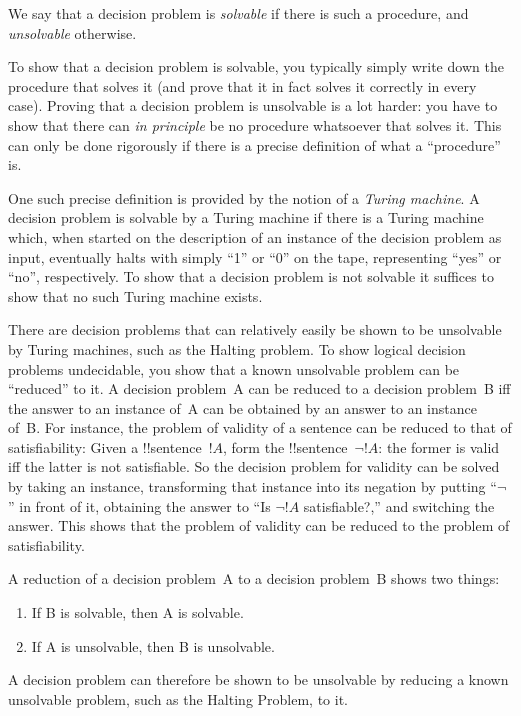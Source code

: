 \documentclass[../../include/open-logic-section]{subfiles}
\begin{document}
\begin{explain}
We say that a decision problem is \emph{solvable} if there is such a
procedure, and \emph{unsolvable} otherwise.

To show that a decision problem is solvable, you typically simply
write down the procedure that solves it (and prove that it in fact
solves it correctly in every case).  Proving that a decision problem
is unsolvable is a lot harder: you have to show that there can
\emph{in principle} be no procedure whatsoever that solves it.  This
can only be done rigorously if there is a precise definition of what a
``procedure'' is.

One such precise definition is provided by the notion of a
\emph{Turing machine}.  A decision problem is solvable by a Turing
machine if there is a Turing machine which, when started on the
description of an instance of the decision problem as input,
eventually halts with simply ``1'' or ``0'' on the tape, representing
``yes'' or ``no'', respectively.  To show that a decision problem is
not solvable it suffices to show that no such Turing machine exists.

There are decision problems that can relatively easily be shown to be
unsolvable by Turing machines, such as the Halting problem.  To show
logical decision problems undecidable, you show that a known
unsolvable problem can be ``reduced'' to it.  A decision problem~A can
be reduced to a decision problem~B iff the answer to an instance of~A
can be obtained by an answer to an instance of~B.  For instance, the
problem of validity of a sentence can be reduced to that of
satisfiability: Given a !!{sentence}~$!A$, form the !!{sentence}~$\lnot !A$:
the former is valid iff the latter is not satisfiable.  So the decision
problem for validity can be solved by taking an instance, transforming
that instance into its negation by putting ``$\lnot$'' in front of it,
obtaining the answer to ``Is $\lnot !A$ satisfiable?,'' and switching
the answer.  This shows that the problem of validity can be reduced to
the problem of satisfiability.

A reduction of a decision problem~A to a decision problem~B shows two things:
\begin{enumerate}
\item If B is solvable, then A is solvable.
\item If A is unsolvable, then B is unsolvable.
\end{enumerate}

A decision problem can therefore be shown to be unsolvable by reducing
a known unsolvable problem, such as the Halting Problem, to it.
\end{explain}
\end{document}
